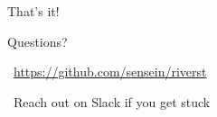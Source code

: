 \documentclass[aspectratio=169]{beamer}
\begin{document}
\begin{frame}
\begin{center}
\vspace{1cm}
\Huge That's it!

\vspace{1cm}

\Large Questions?

\vspace{1cm}

\normalsize
\faGithub\ \url{https://github.com/sensein/riverst}

\vspace{0.3cm}

\faEnvelope\ Reach out on Slack if you get stuck
\end{center}
\end{frame}
\end{document}

